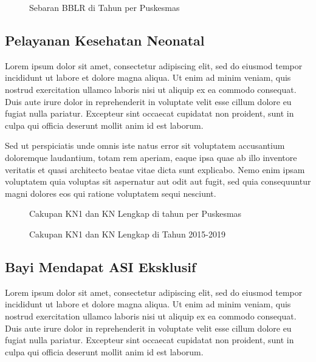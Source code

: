 \begin{figure}[H]
  \centering
  \caption{Sebaran BBLR di \namaKabupaten Tahun \tP per Puskesmas}
  \label{fig:Distribusi-BBLR}
\end{figure}

\subsection{Pelayanan Kesehatan Neonatal}
Lorem ipsum dolor sit amet, consectetur adipiscing elit, sed do eiusmod tempor incididunt ut labore et dolore magna aliqua. Ut enim ad minim veniam, quis nostrud exercitation ullamco laboris nisi ut aliquip ex ea commodo consequat. Duis aute irure dolor in reprehenderit in voluptate velit esse cillum dolore eu fugiat nulla pariatur. Excepteur sint occaecat cupidatat non proident, sunt in culpa qui officia deserunt mollit anim id est laborum.

Sed ut perspiciatis unde omnis iste natus error sit voluptatem accusantium doloremque laudantium, totam rem aperiam, eaque ipsa quae ab illo inventore veritatis et quasi architecto beatae vitae dicta sunt explicabo. Nemo enim ipsam voluptatem quia voluptas sit aspernatur aut odit aut fugit, sed quia consequuntur magni dolores eos qui ratione voluptatem sequi nesciunt.

\begin{figure}[H]
    \centering
    \caption{Cakupan KN1 dan KN Lengkap di \namaKabupaten tahun \tP per Puskesmas}
    \label{fig:Cakupan-KN1-KNlengkap}
\end{figure}

\begin{figure}[H]
    \centering
    \caption{Cakupan KN1 dan KN Lengkap di \namaKabupaten Tahun 2015-2019}
    \label{fig:KN1-KNlengkap-2015-2019}
\end{figure}

\subsection{Bayi Mendapat ASI Eksklusif}
Lorem ipsum dolor sit amet, consectetur adipiscing elit, sed do eiusmod tempor incididunt ut labore et dolore magna aliqua. Ut enim ad minim veniam, quis nostrud exercitation ullamco laboris nisi ut aliquip ex ea commodo consequat. Duis aute irure dolor in reprehenderit in voluptate velit esse cillum dolore eu fugiat nulla pariatur. Excepteur sint occaecat cupidatat non proident, sunt in culpa qui officia deserunt mollit anim id est laborum.

